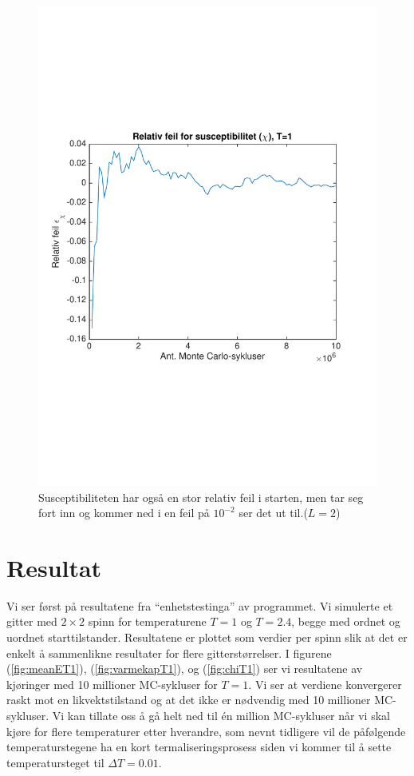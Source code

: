 \documentclass[norsk, 10pt]{article}
\begin{document}
\begin{figure}[H]
\centering
\includegraphics[scale = 0.5, trim = 1cm 8cm 1cm 8cm]{b_rel_err_chi_L2_T1.pdf}
\caption{Susceptibiliteten har også en stor relativ feil i starten, men tar seg fort inn og kommer ned i en feil på $10^{-2}$ ser det ut til.($L=2$)}
\label{fig:errchiT1L2}
\end{figure}


\section*{Resultat}
Vi ser først på resultatene fra ``enhetstestinga'' av programmet. Vi simulerte et gitter med $2\times2$ spinn for temperaturene $T=1$ og $T=2.4$, begge med ordnet og uordnet starttilstander. Resultatene er plottet som verdier per spinn slik at det er enkelt å sammenlikne resultater for flere gitterstørrelser. I figurene (\ref{fig:meanET1}), (\ref{fig:varmekapT1}), og (\ref{fig:chiT1}) ser vi resultatene av kjøringer med 10 millioner MC-sykluser for $T=1$. Vi ser at verdiene konvergerer raskt mot en likvektstilstand og at det ikke er nødvendig med 10 millioner MC-sykluser. Vi kan tillate oss å gå helt ned til én million MC-sykluser når vi skal kjøre for flere temperaturer etter hverandre, som nevnt tidligere vil de påfølgende temperaturstegene ha en kort termaliseringsprosess siden vi kommer til å sette temperatursteget til $\Delta T = 0.01$.
\end{document}
